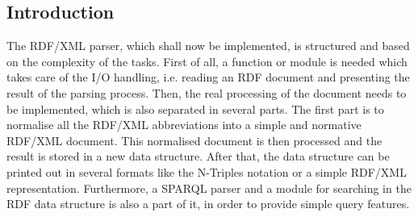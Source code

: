 \documentclass[11pt,a4paper,headsepline, bibtotoc]{scrreprt}
\begin{document}
\subsection{Introduction}
The RDF/XML parser, which shall now be implemented, is structured and based on the complexity of the tasks. First of all, a function or module is needed which takes care of the I/O handling, i.e. reading an RDF document and presenting the result of the parsing process. Then, the real processing of the document needs to be implemented, which is also separated in several parts. The first part is to normalise all the RDF/XML abbreviations into a simple and normative RDF/XML document. This normalised document is then processed and the result is stored in a new data structure. After that, the data structure can be printed out in several formats like the N-Triples notation or a simple RDF/XML representation. Furthermore, a SPARQL parser and a module for searching in the RDF data structure is also a part of it, in order to provide simple query features.
\end{document}
